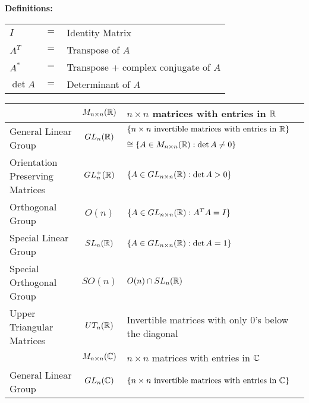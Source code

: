 \newpage
\noindent \textbf{Definitions: }
\begin{center}
	\begin{tabular}{l c l}
		$I $ & $=$ & Identity Matrix \\
		$A^T$ & $=$ & Transpose of $A $ \\
		$A^*$ & $=$ & Transpose + complex conjugate of $A$ \\
		$\det A$ & $=$ & Determinant of $A$\\
	\end{tabular}
\end{center}
\begin{center}
	\setlength\extrarowheight{10pt}
	\begin{tabular}{|l|c|l|}
		\hline
		                                & $M_{n \times n}(\mathbb{R})$        & $n \times n$ matrices with entries in $\mathbb{R}$                         \\\hline
		\multirow{2}{*}{General Linear Group}
		                                & \multirow{2}{*}{$GL_n(\mathbb{R})$} & $\{ n \times n \mbox{ invertible matrices with entries in } \mathbb{R} \}$ \\
		                                &                             & $\cong \{ A \in M_{n \times n}(\mathbb{R}) : \det A \neq 0\}$              \\\hline
		Orientation Preserving Matrices & $GL^+_n(\mathbb{R})$                & $\{ A \in GL_{n \times n}(\mathbb{R}) : \det A > 0\}$                      \\\hline
		Orthogonal Group                & $O(n)$                      & $\{ A \in GL_{n \times n}(\mathbb{R}) : A^TA = I\}$                        \\\hline
		Special Linear Group            & $SL_n(\mathbb{R})$                  & $\{ A \in GL_{n \times n}(\mathbb{R}) : \det A =1\}$                       \\\hline
		Special Orthogonal Group        & $SO(n)$                     & $O(n) \cap SL_n(\mathbb{R})$                                               \\\hline
    Upper Triangular Matrices & $UT_n(\mathbb{R})$ & Invertible matrices with only 0's below the diagonal \\\hline
		                                & $M_{n \times n}(\mathbb{C})$        & $n \times n$ matrices with entries in $\mathbb{C}$                         \\\hline
		\multirow{2}{*}{General Linear Group}
		                                & \multirow{2}{*}{$GL_n(\mathbb{C})$} & $\{ n \times n \mbox{ invertible matrices with entries in } \mathbb{C} \}$ \\

\end{tabular}
\end{center}
